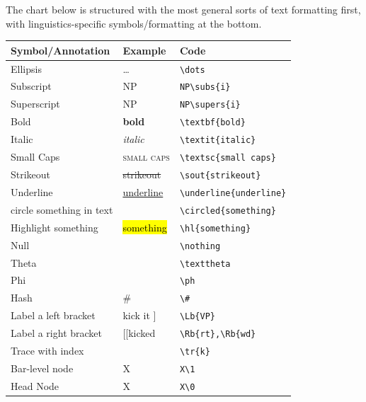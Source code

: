 \documentclass{article}
\begin{document}
The chart below is structured with the most general sorts of text formatting first, with linguistics-specific symbols/formatting at the bottom.

\ea 
	\begin{tabular}[t]{l l l}
		\toprule
		\textbf{Symbol/Annotation} & \textbf{Example} & \textbf{Code} \\ \midrule
		Ellipsis & \dots & \verb|\dots| \\
		Subscript & NP\subs{i} & \verb|NP\subs{i}| \\
		Superscript & NP\supers{i} & \verb|NP\supers{i}|\\ 
		Bold & \textbf{bold} & \verb|\textbf{bold}| \\
		Italic & \textit{italic} & \verb|\textit{italic}| \\
		Small Caps & \textsc{small caps} & \verb|\textsc{small caps}| \\
		Strikeout & \sout{strikeout} & \verb|\sout{strikeout}| \\
		Underline & \underline{underline} & \verb|\underline{underline}| \\
		circle something in text & \circled{something} & \verb|\circled{something}| \\
		Highlight something & \hl{something} & \verb|\hl{something}| \\
		Null & \nothing  & \verb|\nothing|\\
		Theta & \texttheta & \verb|\texttheta|  \\
		Phi & \ph & \verb|\ph| \\
		Hash & \# & \verb|\#| \\
		Label a left bracket & \Lb{VP} kick it ] & \verb|\Lb{VP}|\\
		Label a right bracket & [[kick\Rb{rt}ed\Rb{wd} & \verb|\Rb{rt},\Rb{wd}|\\
		Trace with index & \tr{k}  & \verb|\tr{k}| \\
		Bar-level node & X\1 & \verb|X\1| \\
		Head Node & X\0 & \verb|X\0| \\
		\bottomrule
	\end{tabular}
\z

\newpage 
\end{document}
